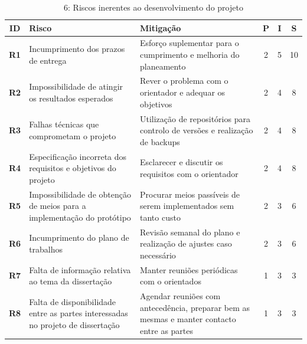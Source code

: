 \begin{table}[H]
    \begin{center}
        \begin{tabular}{| c | m{6cm} | m{6cm} | c | c | c |}
            \hline
            \textbf{ID} & \textbf{Risco} & \textbf{Mitigação} & \textbf{P} & \textbf{I} & \textbf{S}\\ [0.5ex] 
            \hline\hline
            \textbf{R1} & Incumprimento dos prazos de entrega & Esforço suplementar para o cumprimento e melhoria do planeamento & 2 & 5 & 10\\ 
            \hline
            \textbf{R2} & Impossibilidade de atingir os resultados esperados & Rever o problema com o orientador e adequar os objetivos & 2 & 4 & 8\\
            \hline
            \textbf{R3} & Falhas técnicas que comprometam o projeto & Utilização de repositórios para controlo de versões e realização de backups & 2 & 4 & 8\\
            \hline
            \textbf{R4} & Especificação incorreta dos requisitos e objetivos do projeto & Esclarecer e discutir os requisitos com o orientador & 2 & 4 & 8\\ 
            \hline
            \textbf{R5} & Impossibilidade de obtenção de meios para a implementação do protótipo & Procurar meios passíveis de serem implementados sem tanto custo & 2 & 3 & 6\\  
            \hline
            \textbf{R6} & Incumprimento do plano de trabalhos & Revisão semanal do plano e realização de ajustes caso necessário & 2 & 3 & 6\\
            \hline
            \textbf{R7} & Falta de informação relativa ao tema da dissertação & Manter reuniões periódicas com o orientados & 1 & 3 & 3\\
            \hline
            \textbf{R8} & Falta de disponibilidade entre as partes interessadas no projeto de dissertação & Agendar reuniões com antecedência, preparar bem as mesmas e manter contacto entre as partes & 1 & 3 & 3\\
            \hline
        \end{tabular}
    \end{center}
    \caption[Tabela 6: Riscos inerentes ao desenvolvimento do projeto]{6: Riscos inerentes ao desenvolvimento do projeto}
\end{table}

